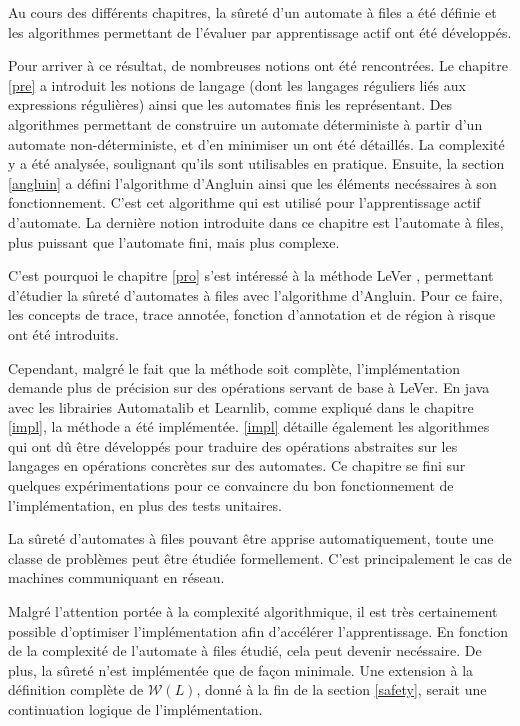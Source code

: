 Au cours des différents chapitres, la sûreté d'un automate à files a été définie et les algorithmes permettant de l'évaluer par apprentissage actif ont été développés.

Pour arriver à ce résultat, de nombreuses notions ont été rencontrées. Le chapitre \ref{pre} a introduit les notions de langage (dont les langages réguliers liés aux expressions régulières) ainsi que les automates finis les représentant. Des algorithmes permettant de construire un automate déterministe à partir d'un automate non-déterministe, et d'en minimiser un ont été détaillés. La complexité y a été analysée, soulignant qu'ils sont utilisables en pratique. Ensuite, la section \ref{angluin} a défini l'algorithme d'Angluin ainsi que les éléments necéssaires à son fonctionnement. C'est cet algorithme qui est utilisé pour l'apprentissage actif d'automate. La dernière notion introduite dans ce chapitre est l'automate à files, plus puissant que l'automate fini, mais plus complexe.

C'est pourquoi le chapitre \ref{pro} s'est intéressé à la méthode LeVer \cite{Vardhan04}, permettant d'étudier la sûreté d'automates à files avec l'algorithme d'Angluin. Pour ce faire, les concepts de trace, trace annotée, fonction d'annotation et de région à risque ont été introduits.

Cependant, malgré le fait que la méthode soit complète, l'implémentation demande plus de précision sur des opérations servant de base à LeVer. En java avec les librairies Automatalib et Learnlib, comme expliqué dans le chapitre \ref{impl}, la méthode a été implémentée. \ref{impl} détaille également les algorithmes qui ont dû être développés pour traduire des opérations abstraites sur les langages en opérations concrètes sur des automates. Ce chapitre se fini sur quelques expérimentations pour ce convaincre du bon fonctionnement de l'implémentation, en plus des tests unitaires.

La sûreté d'automates à files pouvant être apprise automatiquement, toute une classe de problèmes peut être étudiée formellement. C'est principalement le cas de machines communiquant en réseau.

Malgré l'attention portée à la complexité algorithmique, il est très certainement possible d'optimiser l'implémentation afin d'accélérer l'apprentissage. En fonction de la complexité de l'automate à files étudié, cela peut devenir necéssaire. De plus, la sûreté n'est implémentée que de façon minimale. Une extension à la définition complète de $\mathcal{W}(L)$, donné à la fin de la section \ref{safety}, serait une continuation logique de l'implémentation.
